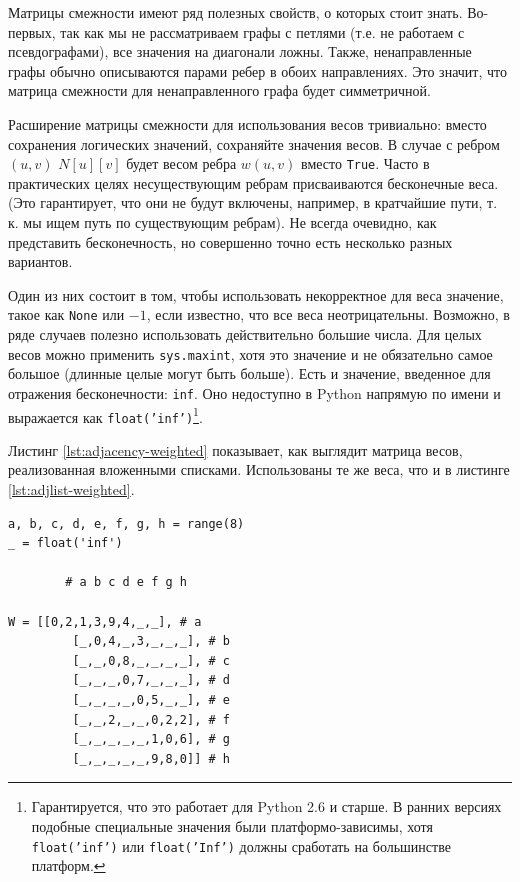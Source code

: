 Матрицы смежности имеют ряд полезных свойств, о которых стоит знать. Во-первых, так как мы не рассматриваем графы с петлями (т.е. не работаем с псевдографами), все значения на диагонали ложны. Также, ненаправленные графы обычно описываются парами ребер в обоих направлениях. Это значит, что матрица смежности для ненаправленного графа будет симметричной.

Расширение матрицы смежности для использования весов тривиально: вместо сохранения логических значений, сохраняйте значения весов. В случае с ребром $(u, v)$ $N[u][v]$ будет весом ребра $w(u,v)$ вместо \texttt{True}. Часто в практических целях несуществующим ребрам присваиваются бесконечные веса. (Это гарантирует, что они не будут включены, например, в кратчайшие пути, т. к. мы ищем путь по существующим ребрам). Не всегда очевидно, как представить бесконечность, но совершенно точно есть несколько разных вариантов.

Один из них состоит в том, чтобы использовать некорректное для веса значение, такое как \texttt{None} или $-1$, если известно, что все веса неотрицательны. Возможно, в ряде случаев полезно использовать действительно большие числа. Для целых весов можно применить \texttt{sys.maxint}, хотя это значение и не обязательно самое большое (длинные целые могут быть больше). Есть и значение, введенное для отражения бесконечности: \texttt{inf}. Оно недоступно в Python напрямую по имени и выражается как \texttt{float('inf')}\footnote{Гарантируется, что это работает для Python 2.6 и старше. В ранних версиях подобные специальные значения были платформо-зависимы, хотя \texttt{float('inf')} или \texttt{float('Inf')} должны сработать на большинстве платформ.}.

Листинг \ref{lst:adjacency-weighted} показывает, как выглядит матрица весов, реализованная вложенными списками. Использованы те же веса, что и в листинге \ref{lst:adjlist-weighted}.

\begin{lstlisting}[caption={Матрица весов с бесконечными значениями для отсутствующих ребер}, label={lst:adjacency-weighted}]
a, b, c, d, e, f, g, h = range(8)
_ = float('inf')

		# a b c d e f g h

W = [[0,2,1,3,9,4,_,_], # a
	 	 [_,0,4,_,3,_,_,_], # b
		 [_,_,0,8,_,_,_,_], # c
		 [_,_,_,0,7,_,_,_], # d
		 [_,_,_,_,0,5,_,_], # e
		 [_,_,2,_,_,0,2,2], # f
		 [_,_,_,_,_,1,0,6], # g
		 [_,_,_,_,_,9,8,0]] # h
\end{lstlisting}

